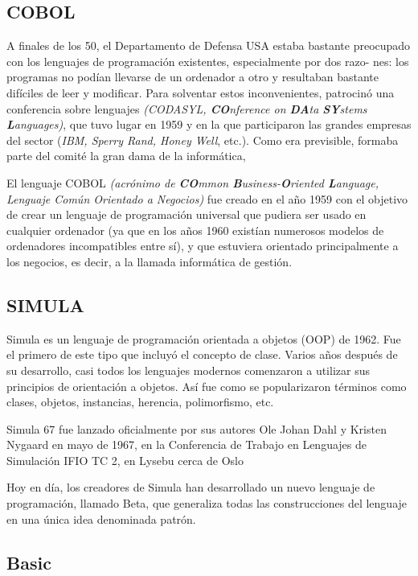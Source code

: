 \documentclass[twoside,twocolumn]{article}
\begin{document}
\subsection{COBOL}

A finales de los 50, el Departamento de Defensa
USA estaba bastante preocupado con los lenguajes de
programación existentes, especialmente por dos razo-
nes: los programas no podían llevarse de un ordenador
a otro y resultaban bastante difíciles de leer y modificar.
Para solventar estos inconvenientes, patrocinó una
conferencia sobre lenguajes \textit{(CODASYL, \textbf{CO}nference
on \textbf{DA}ta \textbf{SY}stems \textbf{L}anguages)}, que tuvo lugar en 1959
y en la que participaron las grandes empresas del sector (\textit{IBM, Sperry Rand, Honey Well}, etc.). Como era
previsible, formaba parte del comité la gran dama de la
informática,

El lenguaje COBOL \textit{(acrónimo de \textbf{CO}mmon \textbf{B}usiness-\textbf{O}riented \textbf{L}anguage, Lenguaje Común Orientado a Negocios)} fue creado en el año 1959 con el objetivo de crear un lenguaje de programación universal que pudiera ser usado en cualquier ordenador (ya que en los años 1960 existían numerosos modelos de ordenadores incompatibles entre sí), y que estuviera orientado principalmente a los negocios, es decir, a la llamada informática de gestión.

\subsection{SIMULA}

Simula es un lenguaje de programación orientada a objetos (OOP) de 1962. Fue el primero de este tipo que incluyó el concepto de clase. Varios años después de su desarrollo, casi todos los lenguajes modernos comenzaron a utilizar sus principios de orientación a objetos. Así fue como se popularizaron términos como clases, objetos, instancias, herencia, polimorfismo, etc.

Simula 67 fue lanzado oficialmente por sus autores Ole Johan Dahl y Kristen Nygaard en mayo de 1967, en la Conferencia de Trabajo en Lenguajes de Simulación IFIO TC 2, en Lysebu cerca de Oslo

Hoy en día, los creadores de Simula han desarrollado un nuevo lenguaje de programación, llamado Beta, que generaliza todas las construcciones del lenguaje en una única idea denominada patrón.

\subsection{Basic}
\end{document}
